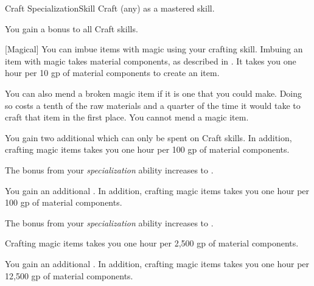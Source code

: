     \begin{feat}{Craft Specialization}{Skill}
        \featpre Craft (any) as a mastered skill.

         You gain a  bonus to all Craft skills.

        [Magical] You can imbue items with magic using your crafting skill.
        Imbuing an item with magic takes material components, as described in .
        It takes you one hour per 10 gp of material components to create an item.

        You can also mend a broken magic item if it is one that you could make.
        Doing so costs a tenth of the raw materials and a quarter of the time it would take to craft that item in the first place.
        You cannot mend a  magic item.

         You gain two additional  which can only be spent on Craft skills.
        In addition, crafting magic items takes you one hour per 100 gp of material components.

         The bonus from your \textit{specialization} ability increases to .

         You gain an additional .
        In addition, crafting magic items takes you one hour per 100 gp of material components.

         The bonus from your \textit{specialization} ability increases to .

        \ff[17]{}
        Crafting magic items takes you one hour per 2,500 gp of material components.

         You gain an additional .
        In addition, crafting magic items takes you one hour per 12,500 gp of material components.
    \end{feat}

